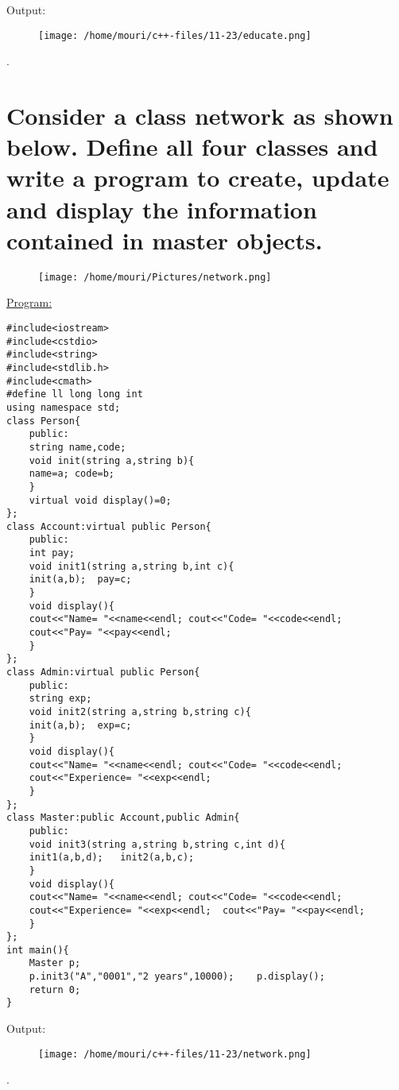 \documentclass[a4paper,11pt]{article}
\begin{document}
Output:
\begin{figure}[H]
\centering
\texttt{[image: /home/mouri/c++-files/11-23/educate.png]}
\end{figure}
.

\section{Consider a class network as shown below. Define all four classes and write a program to create, update and display the information contained in master objects.}
\begin{figure}[H]
\centering
\texttt{[image: /home/mouri/Pictures/network.png]}
\end{figure}
\underline{Program:}
\begin{lstlisting}[showstringspaces=false]
#include<iostream>
#include<cstdio>
#include<string>
#include<stdlib.h>
#include<cmath>
#define ll long long int
using namespace std;
class Person{
    public:
    string name,code;
    void init(string a,string b){
	name=a;	code=b;
    }
    virtual void display()=0;
};
class Account:virtual public Person{
    public:
    int pay;
    void init1(string a,string b,int c){
	init(a,b);	pay=c;
    }
    void display(){
	cout<<"Name= "<<name<<endl;	cout<<"Code= "<<code<<endl;
	cout<<"Pay= "<<pay<<endl;
    }
};
class Admin:virtual public Person{
    public:
    string exp;
    void init2(string a,string b,string c){
	init(a,b);	exp=c;
    }
    void display(){
	cout<<"Name= "<<name<<endl;	cout<<"Code= "<<code<<endl;
	cout<<"Experience= "<<exp<<endl;
    }
};
class Master:public Account,public Admin{
    public:
    void init3(string a,string b,string c,int d){
	init1(a,b,d);	init2(a,b,c);
    }
    void display(){
	cout<<"Name= "<<name<<endl;	cout<<"Code= "<<code<<endl;
	cout<<"Experience= "<<exp<<endl;  cout<<"Pay= "<<pay<<endl;
    }
};
int main(){
    Master p;
    p.init3("A","0001","2 years",10000);    p.display();
    return 0;
}
\end{lstlisting}
Output:
\begin{figure}[H]
\centering
\texttt{[image: /home/mouri/c++-files/11-23/network.png]}
\end{figure}
.
\end{document}
